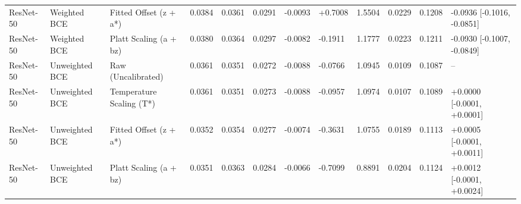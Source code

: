 \begin{tabular}{llllllllllll}
ResNet-50 & Weighted BCE & Fitted Offset (z + a*) & 0.0384 & 0.0361 & 0.0291 & -0.0093 & +0.7008 & 1.5504 & 0.0229 & 0.1208 & -0.0936 [-0.1016, -0.0851] \\
ResNet-50 & Weighted BCE & Platt Scaling (a + bz) & 0.0380 & 0.0364 & 0.0297 & -0.0082 & -0.1911 & 1.1777 & 0.0223 & 0.1211 & -0.0930 [-0.1007, -0.0849] \\
ResNet-50 & Unweighted BCE & Raw (Uncalibrated) & 0.0361 & 0.0351 & 0.0272 & -0.0088 & -0.0766 & 1.0945 & 0.0109 & 0.1087 & -- \\
ResNet-50 & Unweighted BCE & Temperature Scaling (T*) & 0.0361 & 0.0351 & 0.0273 & -0.0088 & -0.0957 & 1.0974 & 0.0107 & 0.1089 & +0.0000 [-0.0001, +0.0001] \\
ResNet-50 & Unweighted BCE & Fitted Offset (z + a*) & 0.0352 & 0.0354 & 0.0277 & -0.0074 & -0.3631 & 1.0755 & 0.0189 & 0.1113 & +0.0005 [-0.0001, +0.0011] \\
ResNet-50 & Unweighted BCE & Platt Scaling (a + bz) & 0.0351 & 0.0363 & 0.0284 & -0.0066 & -0.7099 & 0.8891 & 0.0204 & 0.1124 & +0.0012 [-0.0001, +0.0024] \\
\bottomrule
\end{tabular}
